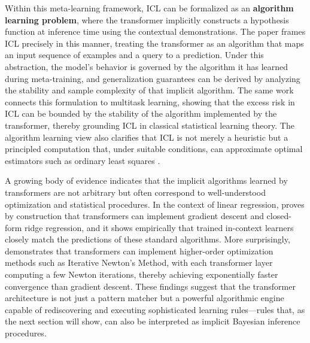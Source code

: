 \documentclass[11pt]{article}
\begin{document}
Within this meta-learning framework, ICL can be formalized as an \textbf{algorithm learning problem}, where the transformer implicitly constructs a hypothesis function at inference time using the contextual demonstrations. The paper \cite{ref4} frames ICL precisely in this manner, treating the transformer as an algorithm that maps an input sequence of examples and a query to a prediction. Under this abstraction, the model's behavior is governed by the algorithm it has learned during meta-training, and generalization guarantees can be derived by analyzing the stability and sample complexity of that implicit algorithm. The same work connects this formulation to multitask learning, showing that the excess risk in ICL can be bounded by the stability of the algorithm implemented by the transformer, thereby grounding ICL in classical statistical learning theory. The algorithm learning view also clarifies that ICL is not merely a heuristic but a principled computation that, under suitable conditions, can approximate optimal estimators such as ordinary least squares \cite{ref1}.

A growing body of evidence indicates that the implicit algorithms learned by transformers are not arbitrary but often correspond to well-understood optimization and statistical procedures. In the context of linear regression, \cite{ref5} proves by construction that transformers can implement gradient descent and closed-form ridge regression, and it shows empirically that trained in-context learners closely match the predictions of these standard algorithms. More surprisingly, \cite{ref6} demonstrates that transformers can implement higher-order optimization methods such as Iterative Newton's Method, with each transformer layer computing a few Newton iterations, thereby achieving exponentially faster convergence than gradient descent. These findings suggest that the transformer architecture is not just a pattern matcher but a powerful algorithmic engine capable of rediscovering and executing sophisticated learning rules---rules that, as the next section will show, can also be interpreted as implicit Bayesian inference procedures.
\end{document}
